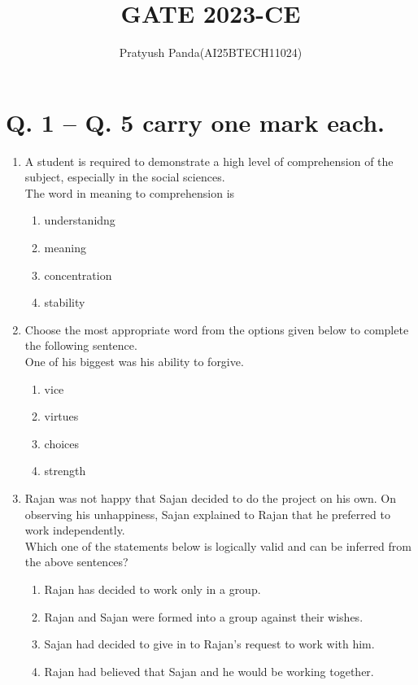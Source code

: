 \documentclass[journal,12pt,onecolumn]{IEEEtran}
\theoremstyle{remark}
\begin{document}
\title{GATE 2023-CE}
\author{Pratyush Panda(AI25BTECH11024)}
\maketitle

\renewcommand{\thefigure}{\theenumi}
\renewcommand{\thetable}{\theenumi}

\section{Q. 1 – Q. 5 carry one mark each.}

\begin{enumerate}
\item A student is required to demonstrate a high level of comprehension of the subject, especially in the social sciences.\\
The word in meaning to comprehension is

\hfill{}
\begin{enumerate}
\item understanidng
\item meaning
\item concentration
\item stability
\end{enumerate}

\item Choose the most appropriate word from the options given below to complete the following sentence.\\
One of his biggest \underline{\hspace{1cm}} was his ability to forgive.

\hfill{}
\begin{enumerate}
\item vice
\item virtues
\item choices
\item strength
\end{enumerate}

\item Rajan was not happy that Sajan decided to do the project on his own. On observing his unhappiness, Sajan explained to Rajan that he preferred to work independently.\\
Which one of the statements below is logically valid and can be inferred from the above sentences?

\hfill{}
\begin{enumerate}
\item Rajan has decided to work only in a group.
\item Rajan and Sajan were formed into a group against their wishes.
\item Sajan had decided to give in to Rajan’s request to work with him.
\item Rajan had believed that Sajan and he would be working together.
\end{enumerate}


\end{enumerate}
\end{document}
